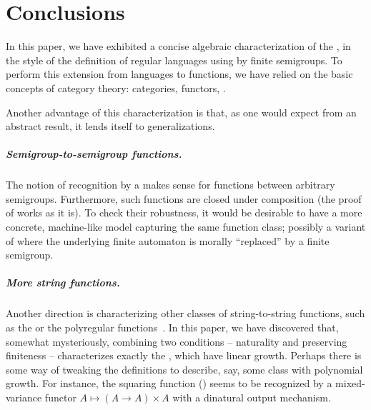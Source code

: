 \section{Conclusions}\label{sec:conclusion}

In this paper, we have exhibited a concise algebraic characterization of the
, in the style of the definition of regular
languages using  by finite semigroups. To perform this extension from
languages to functions, we have relied on the basic concepts of category theory:
categories, functors, .

Another advantage of this characterization is that, as one would expect from an abstract result, it lends itself to generalizations.

\subparagraph{Semigroup-to-semigroup functions.}

The notion of recognition by a   makes
sense for functions between arbitrary semigroups. Furthermore, such functions
are closed under composition (the proof of  works as it
is). To check their robustness, it would be desirable to have a more concrete,
machine-like model capturing the same function class; possibly a variant of
 where the underlying finite automaton is morally
\enquote{replaced} by a finite semigroup.

\subparagraph{More string functions.} Another direction is
characterizing other classes of string-to-string functions, such as the  or the polyregular functions~\cite{PolyregSurvey}. In this paper, we have discovered that,
somewhat mysteriously, combining two conditions -- naturality and preserving
finiteness -- characterizes exactly the , which have linear
growth. Perhaps there is some way of tweaking the definitions to describe, say, some class with polynomial growth. For instance, the squaring function
() seems to be recognized by a mixed-variance functor
$A \mapsto (A \to A) \times A$ with a dinatural output mechanism.

